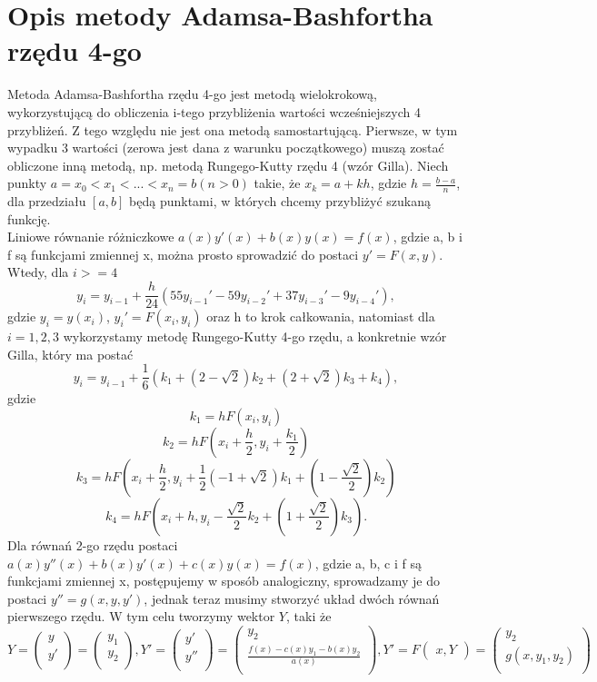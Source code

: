 \documentclass[a4paper,12pt]{article}
\begin{document}
\section*{Opis metody Adamsa-Bashfortha rzędu 4-go}
Metoda Adamsa-Bashfortha rzędu 4-go jest metodą wielokrokową, wykorzystującą do obliczenia i-tego przybliżenia wartości wcześniejszych 4 przybliżeń. Z tego względu nie jest ona metodą samostartującą. Pierwsze, w tym wypadku 3 wartości (zerowa jest dana z warunku początkowego) muszą zostać obliczone inną metodą, np. metodą Rungego-Kutty rzędu 4 (wzór Gilla). Niech punkty $a = x_0 < x_1 < ... < x_n = b (n > 0)$ takie, że $x_k = a + kh$, gdzie $h = \frac{b-a}{n}$, dla przedziału $[a,b]$ będą punktami, w których chcemy przybliżyć szukaną funkcję.
\\Liniowe równanie różniczkowe $a(x)y'(x) + b(x)y(x) = f(x)$, gdzie a, b i f są funkcjami zmiennej x, można prosto sprowadzić do postaci $y' = F(x,y)$. Wtedy, dla $i >= 4$
\[ y_i = y_{i-1} + \frac{h}{24}(55y_{i-1}' - 59y_{i-2}' + 37y_{i-3}' - 9y_{i-4}' ), \]
gdzie $y_i = y(x_i)$, $y_i' = F(x_i, y_i)$ oraz h to krok całkowania, natomiast dla $i = {1, 2, 3}$ wykorzystamy metodę Rungego-Kutty 4-go rzędu, a konkretnie wzór Gilla, który ma postać 
\[y_i = y_{i-1} + \frac{1}{6}(k_1 + (2 - \sqrt{2})k_2 + (2 + \sqrt{2})k_3 + k_4),\]
gdzie 
\[k_1 = hF(x_i, y_i)\]
\[k_2 = hF ( x_i + \frac{h}{2}, y_i + \frac{k_1}{2} ) \]
\[k_3 = hF(x_i + \frac{h}{2}, y_i + \frac{1}{2}(-1 + \sqrt{2})k_1 + (1 - \frac{\sqrt{2}}{2})k_2)\]
\[k_4 = hF(x_i + h, y_i - \frac{\sqrt{2}}{2}k_2 + (1 + \frac{\sqrt{2}}{2})k_3).\]
Dla równań 2-go rzędu postaci $a(x)y''(x) + b(x)y'(x) + c(x)y(x) = f(x)$, gdzie a, b, c i f są funkcjami zmiennej x, postępujemy w sposób analogiczny, sprowadzamy je do postaci $y'' = g(x, y, y')$, jednak teraz musimy stworzyć układ dwóch równań pierwszego rzędu. W tym celu tworzymy wektor $Y$, taki że
\[Y = \begin{pmatrix}
           y \\
           y' \\
         \end{pmatrix}
         = \begin{pmatrix}
             y_1 \\
             y_2 \\
         \end{pmatrix}
         ,
         Y' = \begin{pmatrix}
             y' \\
             y'' \\
         \end{pmatrix}
         = \begin{pmatrix}
             y_2 \\
             \frac{f(x) - c(x)y_1 - b(x)y_2}{a(x)} \\
         \end{pmatrix}
         ,
         Y' = F\begin{pmatrix}
            x, Y
         \end{pmatrix}
         = \begin{pmatrix}
             y_2 \\
             g(x, y_1, y_2) \\
         \end{pmatrix}
         \]
\end{document}
